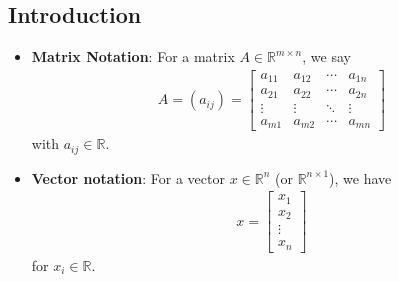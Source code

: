 \documentclass{report}
\begin{document}
    \pagebreak 
    \bigbreak \noindent 
    \subsection{Introduction}
    \bigbreak \noindent 
    \begin{itemize}
        \item \textbf{Matrix Notation}: For a matrix $A \in \mathbb{R}^{m\times n} $, we say
            \begin{align*}
                A = (a_{ij}) = \begin{bmatrix}
                    a_{11} & a_{12} & \cdots & a_{1n} \\
                    a_{21} & a_{22} & \cdots & a_{2n} \\
                    \vdots & \vdots & \ddots & \vdots \\
                    a_{m1} & a_{m2} & \cdots & a_{mn}
                \end{bmatrix}
            \end{align*}
            with $a_{ij} \in \mathbb{R} $.
        \item \textbf{Vector notation}: For a vector $x \in \mathbb{R}^{n} $ (or $\mathbb{R}^{n\times 1} $), we have
            \begin{align*}
                x = \begin{bmatrix}
                    x_{1} \\ x_{2} \\ \vdots \\ x_{n}
                \end{bmatrix}
            \end{align*}
            for $x_{i} \in \mathbb{R} $.


\end{itemize}
\end{document}
